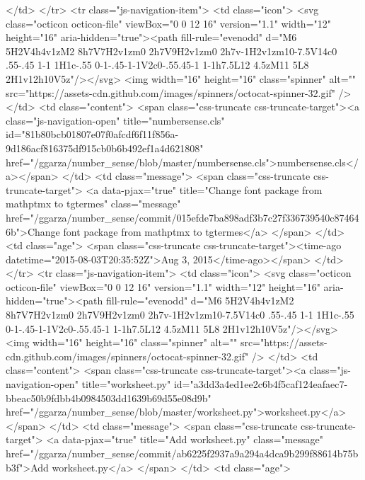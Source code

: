           </td>
        </tr>
        <tr class="js-navigation-item">
          <td class="icon">
            <svg class="octicon octicon-file" viewBox="0 0 12 16" version="1.1" width="12" height="16" aria-hidden="true"><path fill-rule="evenodd" d="M6 5H2V4h4v1zM2 8h7V7H2v1zm0 2h7V9H2v1zm0 2h7v-1H2v1zm10-7.5V14c0 .55-.45 1-1 1H1c-.55 0-1-.45-1-1V2c0-.55.45-1 1-1h7.5L12 4.5zM11 5L8 2H1v12h10V5z"/></svg>
            <img width="16" height="16" class="spinner" alt="" src="https://assets-cdn.github.com/images/spinners/octocat-spinner-32.gif" />
          </td>
          <td class="content">
            <span class="css-truncate css-truncate-target"><a class="js-navigation-open" title="numbersense.cls" id="81b80bcb01807e07f0afcdf6f11f856a-9d186acf816375df915cb0b6b492ef1a4d621808" href="/ggarza/number_sense/blob/master/numbersense.cls">numbersense.cls</a></span>
          </td>
          <td class="message">
            <span class="css-truncate css-truncate-target">
                  <a data-pjax="true" title="Change font package from mathptmx to tgtermes" class="message" href="/ggarza/number_sense/commit/015efde7ba898adf3b7c27f336739540c874646b">Change font package from mathptmx to tgtermes</a>
            </span>
          </td>
          <td class="age">
            <span class="css-truncate css-truncate-target"><time-ago datetime="2015-08-03T20:35:52Z">Aug 3, 2015</time-ago></span>
          </td>
        </tr>
        <tr class="js-navigation-item">
          <td class="icon">
            <svg class="octicon octicon-file" viewBox="0 0 12 16" version="1.1" width="12" height="16" aria-hidden="true"><path fill-rule="evenodd" d="M6 5H2V4h4v1zM2 8h7V7H2v1zm0 2h7V9H2v1zm0 2h7v-1H2v1zm10-7.5V14c0 .55-.45 1-1 1H1c-.55 0-1-.45-1-1V2c0-.55.45-1 1-1h7.5L12 4.5zM11 5L8 2H1v12h10V5z"/></svg>
            <img width="16" height="16" class="spinner" alt="" src="https://assets-cdn.github.com/images/spinners/octocat-spinner-32.gif" />
          </td>
          <td class="content">
            <span class="css-truncate css-truncate-target"><a class="js-navigation-open" title="worksheet.py" id="a3dd3a4ed1ee2c6b4f5caf124eafaec7-bbeac50b9fdbb4b0984503dd1639b69d55e08d9b" href="/ggarza/number_sense/blob/master/worksheet.py">worksheet.py</a></span>
          </td>
          <td class="message">
            <span class="css-truncate css-truncate-target">
                  <a data-pjax="true" title="Add worksheet.py" class="message" href="/ggarza/number_sense/commit/ab6225f2937a9a294a4dca9b299f88614b75bb3f">Add worksheet.py</a>
            </span>
          </td>
          <td class="age">

